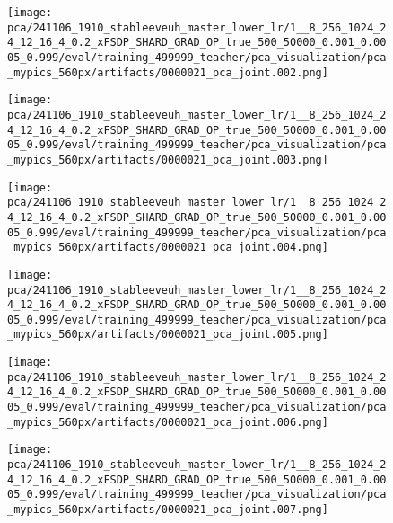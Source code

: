 \begin{figure*}[p]
\begin{subfigure}[t]{0.097\textwidth}
    \end{subfigure}\hfill
    \begin{subfigure}[t]{0.097\textwidth}
        \centering
        \texttt{[image: pca/241106\_1910\_stableeveuh\_master\_lower\_lr/1\_\_8\_256\_1024\_24\_12\_16\_4\_0.2\_xFSDP\_SHARD\_GRAD\_OP\_true\_500\_50000\_0.001\_0.0005\_0.999/eval/training\_499999\_teacher/pca\_visualization/pca\_mypics\_560px/artifacts/0000021\_pca\_joint.002.png]}
    \end{subfigure}\hfill
    \begin{subfigure}[t]{0.097\textwidth}
        \centering
        \texttt{[image: pca/241106\_1910\_stableeveuh\_master\_lower\_lr/1\_\_8\_256\_1024\_24\_12\_16\_4\_0.2\_xFSDP\_SHARD\_GRAD\_OP\_true\_500\_50000\_0.001\_0.0005\_0.999/eval/training\_499999\_teacher/pca\_visualization/pca\_mypics\_560px/artifacts/0000021\_pca\_joint.003.png]}
    \end{subfigure}\hfill
    \begin{subfigure}[t]{0.097\textwidth}
        \centering
        \texttt{[image: pca/241106\_1910\_stableeveuh\_master\_lower\_lr/1\_\_8\_256\_1024\_24\_12\_16\_4\_0.2\_xFSDP\_SHARD\_GRAD\_OP\_true\_500\_50000\_0.001\_0.0005\_0.999/eval/training\_499999\_teacher/pca\_visualization/pca\_mypics\_560px/artifacts/0000021\_pca\_joint.004.png]}
    \end{subfigure}\hfill
    \begin{subfigure}[t]{0.097\textwidth}
        \centering
        \texttt{[image: pca/241106\_1910\_stableeveuh\_master\_lower\_lr/1\_\_8\_256\_1024\_24\_12\_16\_4\_0.2\_xFSDP\_SHARD\_GRAD\_OP\_true\_500\_50000\_0.001\_0.0005\_0.999/eval/training\_499999\_teacher/pca\_visualization/pca\_mypics\_560px/artifacts/0000021\_pca\_joint.005.png]}
    \end{subfigure}\hfill
    \begin{subfigure}[t]{0.097\textwidth}
        \centering
        \texttt{[image: pca/241106\_1910\_stableeveuh\_master\_lower\_lr/1\_\_8\_256\_1024\_24\_12\_16\_4\_0.2\_xFSDP\_SHARD\_GRAD\_OP\_true\_500\_50000\_0.001\_0.0005\_0.999/eval/training\_499999\_teacher/pca\_visualization/pca\_mypics\_560px/artifacts/0000021\_pca\_joint.006.png]}
    \end{subfigure}\hfill
    \begin{subfigure}[t]{0.097\textwidth}
        \centering
        \texttt{[image: pca/241106\_1910\_stableeveuh\_master\_lower\_lr/1\_\_8\_256\_1024\_24\_12\_16\_4\_0.2\_xFSDP\_SHARD\_GRAD\_OP\_true\_500\_50000\_0.001\_0.0005\_0.999/eval/training\_499999\_teacher/pca\_visualization/pca\_mypics\_560px/artifacts/0000021\_pca\_joint.007.png]}

\end{subfigure}
\end{figure*}
